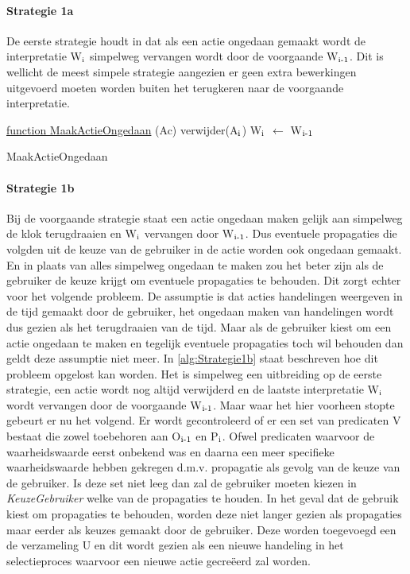 \paragraph{Strategie 1a}
De eerste strategie houdt in dat als een actie ongedaan gemaakt wordt de interpretatie W$\textsubscript{i}$ simpelweg vervangen wordt door de voorgaande W$\textsubscript{i-1}$. Dit is wellicht de meest simpele strategie aangezien er geen extra bewerkingen uitgevoerd moeten worden buiten het terugkeren naar de voorgaande interpretatie.

\begin{algorithm}
	\underline{function MaakActieOngedaan} (Ac)\;
	\Output{}
	verwijder(A$\textsubscript{i}$)\;
	W$\textsubscript{i}$ $\leftarrow$ W$\textsubscript{i-1}$\;
	\caption{MaakActieOngedaan\label{alg:Strategie1a}}
\end{algorithm}

\paragraph{Strategie 1b}
Bij de voorgaande strategie staat een actie ongedaan maken gelijk aan simpelweg de klok terugdraaien en W$\textsubscript{i}$ vervangen door W$\textsubscript{i-1}$. Dus eventuele propagaties die volgden uit de keuze van de gebruiker in de actie worden ook ongedaan gemaakt. En in plaats van alles simpelweg ongedaan te maken zou het beter zijn als de gebruiker de keuze krijgt om eventuele propagaties te behouden. Dit zorgt echter voor het volgende probleem. De assumptie is dat acties handelingen weergeven in de tijd gemaakt door de gebruiker, het ongedaan maken van handelingen wordt dus gezien als het terugdraaien van de tijd. Maar als de gebruiker kiest om een actie ongedaan te maken en tegelijk eventuele propagaties toch wil behouden dan geldt deze assumptie niet meer. In \ref{alg:Strategie1b} staat beschreven hoe dit probleem opgelost kan worden. Het is simpelweg een uitbreiding op de eerste strategie, een actie wordt nog altijd verwijderd en de laatste interpretatie W$\textsubscript{i}$ wordt vervangen door de voorgaande W$\textsubscript{i-1}$. Maar waar het hier voorheen stopte gebeurt er nu het volgend. Er wordt gecontroleerd of er een set van predicaten V bestaat die zowel toebehoren aan O$\textsubscript{i-1}$ en P$\textsubscript{i}$. Ofwel predicaten waarvoor de waarheidswaarde eerst onbekend was en daarna een meer specifieke waarheidswaarde hebben gekregen d.m.v. propagatie als gevolg van de keuze van de gebruiker. Is deze set niet leeg dan zal de gebruiker moeten kiezen in \emph{KeuzeGebruiker} welke van de propagaties te houden. In het geval dat de gebruik kiest om propagaties te behouden, worden deze niet langer gezien als propagaties maar eerder als keuzes gemaakt door de gebruiker. Deze worden toegevoegd een de verzameling U en dit wordt gezien als een nieuwe handeling in het selectieproces waarvoor een nieuwe actie gecre\"{e}erd zal worden.

